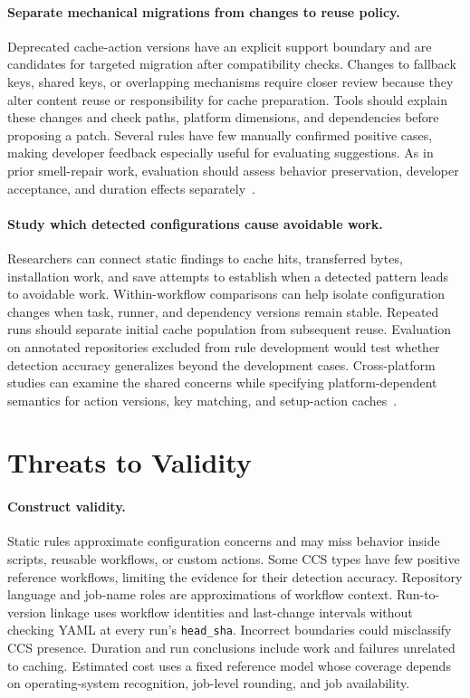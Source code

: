 \documentclass[smallextended]{svjour3}
\begin{document}
\paragraph{Separate mechanical migrations from changes to reuse policy.}
Deprecated cache-action versions have an explicit support boundary and are candidates for targeted migration after compatibility checks. Changes to fallback keys, shared keys, or overlapping mechanisms require closer review because they alter content reuse or responsibility for cache preparation. Tools should explain these changes and check paths, platform dimensions, and dependencies before proposing a patch. Several rules have few manually confirmed positive cases, making developer feedback especially useful for evaluating suggestions. As in prior smell-repair work, evaluation should assess behavior preservation, developer acceptance, and duration effects separately~\citep{zhang2022buildsonic}.

\paragraph{Study which detected configurations cause avoidable work.}
Researchers can connect static findings to cache hits, transferred bytes, installation work, and save attempts to establish when a detected pattern leads to avoidable work. Within-workflow comparisons can help isolate configuration changes when task, runner, and dependency versions remain stable. Repeated runs should separate initial cache population from subsequent reuse. Evaluation on annotated repositories excluded from rule development would test whether detection accuracy generalizes beyond the development cases. Cross-platform studies can examine the shared concerns while specifying platform-dependent semantics for action versions, key matching, and setup-action caches~\citep{urdih2026cache,hasan2026caching}.

\section{Threats to Validity}
\label{sec:threats}

\paragraph{Construct validity.}
Static rules approximate configuration concerns and may miss behavior inside scripts, reusable workflows, or custom actions. Some CCS types have few positive reference workflows, limiting the evidence for their detection accuracy. Repository language and job-name roles are approximations of workflow context. Run-to-version linkage uses workflow identities and last-change intervals without checking YAML at every run's \texttt{head\_sha}. Incorrect boundaries could misclassify CCS presence. Duration and run conclusions include work and failures unrelated to caching. Estimated cost uses a fixed reference model whose coverage depends on operating-system recognition, job-level rounding, and job availability.
\end{document}
